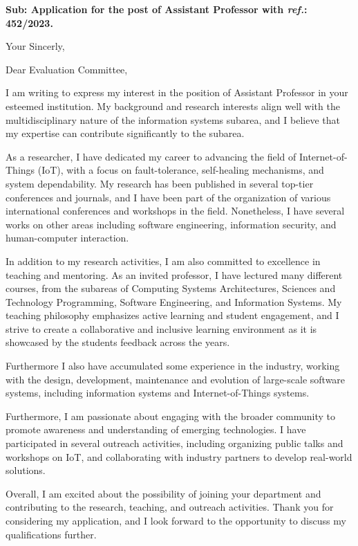 \documentclass[11pt,a4paper,roman]{moderncv}
\begin{document}
\date{\today}
\opening{\textbf{Sub: Application for the post of Assistant Professor with \textit{ref.}: 452/2023.}}
\closing{Your Sincerly, \vspace{-1em}}

\makelettertitle

Dear Evaluation Committee,

I am writing to express my interest in the position of Assistant Professor in your esteemed institution. My background and research interests align well with the multidisciplinary nature of the information systems subarea, and I believe that my expertise can contribute significantly to the subarea.

As a researcher, I have dedicated my career to advancing the field of Internet-of-Things (IoT), with a focus on fault-tolerance, self-healing mechanisms, and system dependability. My research has been published in several top-tier conferences and journals, and I have been part of the organization of various international conferences and workshops in the field. Nonetheless, I have several works on other areas including software engineering, information security, and human-computer interaction.

In addition to my research activities, I am also committed to excellence in teaching and mentoring. As an invited professor, I have lectured many different courses, from the subareas of Computing Systems Architectures, Sciences and Technology Programming, Software Engineering, and Information Systems. My teaching philosophy emphasizes active learning and student engagement, and I strive to create a collaborative and inclusive learning environment as it is showcased by the students feedback across the years.

Furthermore I also have accumulated some experience in the industry, working with the design, development, maintenance and evolution of large-scale software systems, including information systems and Internet-of-Things systems.

Furthermore, I am passionate about engaging with the broader community to promote awareness and understanding of emerging technologies. I have participated in several outreach activities, including organizing public talks and workshops on IoT, and collaborating with industry partners to develop real-world solutions.

Overall, I am excited about the possibility of joining your department and contributing to the research, teaching, and outreach activities. Thank you for considering my application, and I look forward to the opportunity to discuss my qualifications further.

\vspace{0.5cm}


\makeletterclosing
\end{document}
